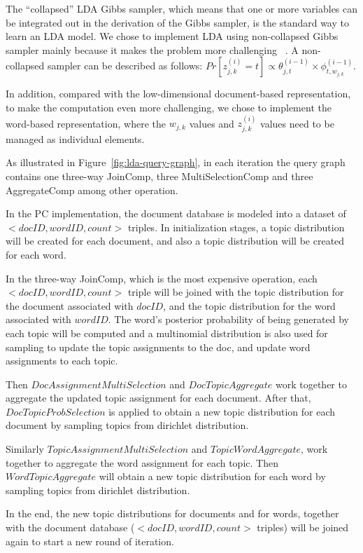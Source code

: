 The
``collapsed'' LDA Gibbs sampler, which means that one or more variables
can be integrated out in the derivation of the Gibbs sampler, is the
standard way to learn an LDA model. We chose to implement
LDA using non-collapsed Gibbs sampler mainly because it makes the
problem more challenging ~\cite{jermaineExperimental}.  A
non-collapsed sampler can be described as follows:
$Pr[z_{j,k}^{(i)}=t] \propto \theta_{j,t}^{(i-1)} \times \phi_{t, w_{j,k}}^{(i-1)}$.


In addition,
compared with the low-dimensional document-based representation, to
make the computation even more challenging, we
chose to implement the word-based representation,
where the $w_{j,k}$ values and $z_{j,k}^{(i)}$ values need to be managed as
individual elements. 


As illustrated in Figure~\ref{fig:lda-query-graph}, in each iteration the query graph contains
one three-way JoinComp, three MultiSelectionComp and three
AggregateComp among other operation. 


\vspace{5pt}
In the PC implementation, the document database is modeled into a
dataset of $<docID, wordID, count>$ triples. In initialization stages, a
topic distribution will be created for each document, and also a topic
distribution will be created for each word. 

In the three-way JoinComp, which is the
most expensive operation, each $<docID, wordID, count>$ 
triple will be joined with the topic distribution for the document
associated with $docID$, and the topic distribution for the word
associated with $wordID$. The word's posterior probability of being
generated by each topic will be computed and a multinomial
distribution is also used for sampling to
update the topic assignments to the doc, and update word assignments
to each topic. 

Then $DocAssignmentMultiSelection$ and
$DocTopicAggregate$ work together to aggregate the updated topic
assignment for each document. After that,
$DocTopicProbSelection$ is applied to obtain a new topic distribution
for each document by sampling topics from dirichlet distribution.

Similarly $TopicAssignmentMultiSelection$ and $TopicWordAggregate$,
work together to aggregate the word
assignment for each topic. Then $WordTopicAggregate$ will obtain a new
topic distribution for each word by sampling topics from
dirichlet distribution.

In the end, the new topic distributions for documents and for words,
together with the document database ($<docID, wordID, count>$ triples)
will be joined again to start a new round of iteration.


